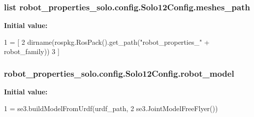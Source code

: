 \subsubsection[{\texorpdfstring{meshes\+\_\+path}{meshes_path}}]{\setlength{\rightskip}{0pt plus 5cm}list robot\+\_\+properties\+\_\+solo.\+config.\+Solo12\+Config.\+meshes\+\_\+path\hspace{0.3cm}{\ttfamily [static]}}\hypertarget{classrobot__properties__solo_1_1config_1_1Solo12Config_ac02a04cc8bec8b94c4c503b8176996c5}{}\label{classrobot__properties__solo_1_1config_1_1Solo12Config_ac02a04cc8bec8b94c4c503b8176996c5}
{\bfseries Initial value\+:}
\begin{DoxyCode}
1 = [
2       dirname(rospkg.RosPack().get\_path(\textcolor{stringliteral}{"robot\_properties\_"} + robot\_family))
3     ]
\end{DoxyCode}
\subsubsection[{\texorpdfstring{robot\+\_\+model}{robot_model}}]{\setlength{\rightskip}{0pt plus 5cm}robot\+\_\+properties\+\_\+solo.\+config.\+Solo12\+Config.\+robot\+\_\+model\hspace{0.3cm}{\ttfamily [static]}}\hypertarget{classrobot__properties__solo_1_1config_1_1Solo12Config_aa3558675d13a055c3c018fe979daaed3}{}\label{classrobot__properties__solo_1_1config_1_1Solo12Config_aa3558675d13a055c3c018fe979daaed3}
{\bfseries Initial value\+:}
\begin{DoxyCode}
1 = se3.buildModelFromUrdf(urdf\_path,
2                                          se3.JointModelFreeFlyer())
\end{DoxyCode}
